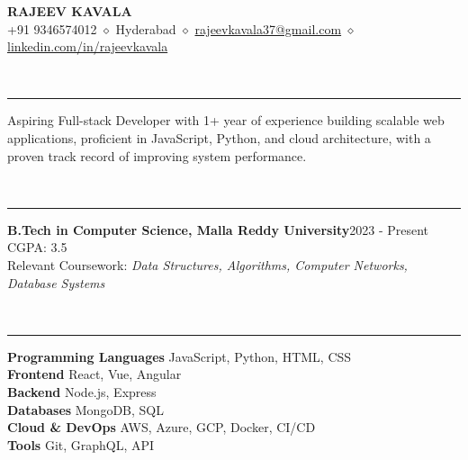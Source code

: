 \documentclass[letterpaper,11pt]{article}
\begin{document}
\begin{center}
  {\LARGE\bfseries RAJEEV KAVALA}\\
  \vspace{2pt}\small +91 9346574012 $\diamond$ Hyderabad $\diamond$ {\color{cyan}\href{\detokenize{mailto:rajeevkavala37@gmail.com}}{rajeevkavala37@gmail.com}} $\diamond$ {\color{cyan}\href{\detokenize{https://linkedin.com/in/rajeevkavala}}{linkedin.com/in/rajeevkavala}}
\end{center}
\vspace{4pt}
\par
{}\\
\vspace{2pt}\hrule\vspace{4pt}
Aspiring Full-stack Developer with 1+ year of experience building scalable web applications, proficient in JavaScript, Python, and cloud architecture, with a proven track record of improving system performance.
\par\vspace{6pt}
\par
{}\\
\vspace{2pt}\hrule\vspace{4pt}
\textbf{B.Tech in Computer Science, Malla Reddy University}\hfill 2023 - Present\\
CGPA: 3.5\\
Relevant Coursework: \textit{Data Structures, Algorithms, Computer Networks, Database Systems}\\
\par\vspace{3pt}
\par\vspace{6pt}
\par
{}\\
\vspace{2pt}\hrule\vspace{4pt}
\textbf{Programming Languages} \quad JavaScript, Python, HTML, CSS\\
\textbf{Frontend} \quad React, Vue, Angular\\
\textbf{Backend} \quad Node.js, Express\\
\textbf{Databases} \quad MongoDB, SQL\\
\textbf{Cloud \& DevOps} \quad AWS, Azure, GCP, Docker, CI/CD\\
\textbf{Tools} \quad Git, GraphQL, API\\
\end{document}
